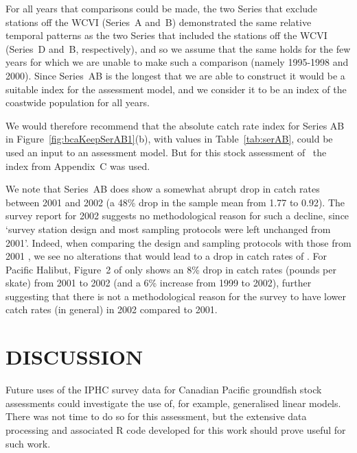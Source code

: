 For all years that comparisons could be made, the two Series that exclude
stations off the WCVI (Series~A and~B) demonstrated the same relative temporal
patterns as the two Series that included the stations off the WCVI (Series~D
and~B, respectively), and so we assume that the same holds for the few years for
which we are unable to make such a comparison (namely 1995-1998 and 2000). Since
Series~AB is the longest that we are able to construct it would be a suitable
index for the assessment model, and we consider it to be an index of the
coastwide population for all years.

We would therefore recommend that the absolute catch rate index for Series AB in
Figure~\ref{fig:bcaKeepSerAB1}(b), with values in Table~\ref{tab:serAB}, could
be used an input to an assessment model. But for this stock assessment of
\spName~the index from Appendix~C was used.

We note that Series~AB does show a somewhat abrupt drop in catch rates between
2001 and 2002 (a 48\% drop in the sample mean from 1.77 to 0.92). The survey
report for 2002 \citep{dvr03} suggests no methodological reason for such a
decline, since `survey station design and most sampling protocols were left
unchanged from 2001'. Indeed, when comparing the design and sampling protocols
with those from 2001 \citep{dvr02}, we see no alterations that would lead to a
drop in catch rates of \spName. For Pacific Halibut, Figure~2 of \citet{dvr03}
only shows an 8\% drop in catch rates (pounds per skate) from 2001 to 2002 (and
a 6\% increase from 1999 to 2002), further suggesting that there is not a
methodological reason for the survey to have lower catch rates (in general) in
2002 compared to 2001.

\section{DISCUSSION}

Future uses of the IPHC survey data for Canadian Pacific groundfish stock
assessments could investigate the use of, for example, generalised linear
models. There was not time to do so for this assessment, but the extensive data
processing and associated R code developed for this work should prove useful for
such work.

